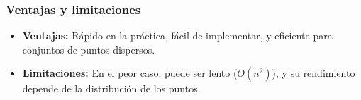 \documentclass[12pt]{book}
\theoremstyle{definition}
\theoremstyle{plain}
\theoremstyle{remark}
\begin{document}
\subsubsection{Ventajas y limitaciones}
\begin{itemize}
    \item \textbf{Ventajas:} Rápido en la práctica, fácil de implementar, y eficiente para conjuntos de puntos dispersos.
    \item \textbf{Limitaciones:} En el peor caso, puede ser lento (\( O(n^2) \)), y su rendimiento depende de la distribución de los puntos.
\end{itemize}



%
%
%
%



\end{document}
